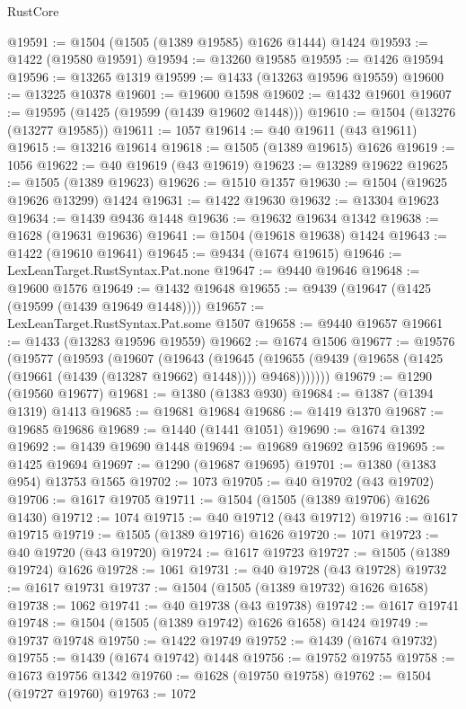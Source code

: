 \begin{lexlean}{RustCore}
\begin{coremodule}
@19591 := @1504 (@1505 (@1389 @19585) @1626 @1444) @1424
@19593 := @1422 (@19580 @19591)
@19594 := @13260 @19585
@19595 := @1426 @19594
@19596 := @13265 @1319
@19599 := @1433 (@13263 @19596 @19559)
@19600 := @13225 @10378
@19601 := @19600 @1598
@19602 := @1432 @19601
@19607 := @19595 (@1425 (@19599 (@1439 @19602 @1448)))
@19610 := @1504 (@13276 (@13277 @19585))
@19611 := 1057
@19614 := @40 @19611 (@43 @19611)
@19615 := @13216 @19614
@19618 := @1505 (@1389 @19615) @1626
@19619 := 1056
@19622 := @40 @19619 (@43 @19619)
@19623 := @13289 @19622
@19625 := @1505 (@1389 @19623)
@19626 := @1510 @1357
@19630 := @1504 (@19625 @19626 @13299) @1424
@19631 := @1422 @19630
@19632 := @13304 @19623
@19634 := @1439 @9436 @1448
@19636 := @19632 @19634 @1342
@19638 := @1628 (@19631 @19636)
@19641 := @1504 (@19618 @19638) @1424
@19643 := @1422 (@19610 @19641)
@19645 := @9434 (@1674 @19615)
@19646 := LexLeanTarget.RustSyntax.Pat.none
@19647 := @9440 @19646
@19648 := @19600 @1576
@19649 := @1432 @19648
@19655 := @9439 (@19647 (@1425 (@19599 (@1439 @19649 @1448))))
@19657 := LexLeanTarget.RustSyntax.Pat.some @1507
@19658 := @9440 @19657
@19661 := @1433 (@13283 @19596 @19559)
@19662 := @1674 @1506
@19677 := @19576
    (@19577
      (@19593
        (@19607
          (@19643
            (@19645
              (@19655 (@9439 (@19658 (@1425 (@19661 (@1439 (@13287 @19662) @1448)))) @9468)))))))
@19679 := @1290 (@19560 @19677)
@19681 := @1380 (@1383 @930)
@19684 := @1387 (@1394 @1319) @1413
@19685 := @19681 @19684
@19686 := @1419 @1370
@19687 := @19685 @19686
@19689 := @1440 (@1441 @1051)
@19690 := @1674 @1392
@19692 := @1439 @19690 @1448
@19694 := @19689 @19692 @1596
@19695 := @1425 @19694
@19697 := @1290 (@19687 @19695)
@19701 := @1380 (@1383 @954) @13753 @1565
@19702 := 1073
@19705 := @40 @19702 (@43 @19702)
@19706 := @1617 @19705
@19711 := @1504 (@1505 (@1389 @19706) @1626 @1430)
@19712 := 1074
@19715 := @40 @19712 (@43 @19712)
@19716 := @1617 @19715
@19719 := @1505 (@1389 @19716) @1626
@19720 := 1071
@19723 := @40 @19720 (@43 @19720)
@19724 := @1617 @19723
@19727 := @1505 (@1389 @19724) @1626
@19728 := 1061
@19731 := @40 @19728 (@43 @19728)
@19732 := @1617 @19731
@19737 := @1504 (@1505 (@1389 @19732) @1626 @1658)
@19738 := 1062
@19741 := @40 @19738 (@43 @19738)
@19742 := @1617 @19741
@19748 := @1504 (@1505 (@1389 @19742) @1626 @1658) @1424
@19749 := @19737 @19748
@19750 := @1422 @19749
@19752 := @1439 (@1674 @19732)
@19755 := @1439 (@1674 @19742) @1448
@19756 := @19752 @19755
@19758 := @1673 @19756 @1342
@19760 := @1628 (@19750 @19758)
@19762 := @1504 (@19727 @19760)
@19763 := 1072

\end{coremodule}
\end{lexlean}
